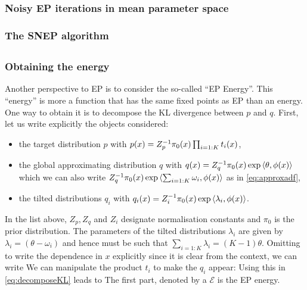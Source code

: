 \subsubsection*{Noisy EP iterations in mean parameter space}

\subsubsection*{The SNEP algorithm}

\subsection{}
\subsubsection*{Obtaining the energy}
Another perspective to EP is to consider the so-called ``EP Energy''. This ``energy'' is more a function that has the same fixed points as EP than an energy. One way to obtain it is to decompose the KL divergence between $p$ and $q$. First, let us write explicitly the objects considered:
\begin{itemize}
	\item the target distribution $p$ with $p(x)=Z_p^{-1} \pi_0(x)\prod_{i=1:K}t_i(x)$,
	\item the global approximating distribution $q$ with $q(x)=Z_q^{-1} \pi_0(x)\exp\left\langle \theta,\phi(x) \right\rangle$ which we can also write $Z_q^{-1} \pi_0(x)\exp\left\langle \sum_{i=1:K}\omega_i,\phi(x) \right\rangle$ as in \eqref{eq:approxadf},
	\item the tilted distributions $q_i$ with $q_i(x)=Z_i^{-1} \pi_0(x)\exp\left\langle \lambda_i,\phi(x) \right\rangle$.
\end{itemize}
In the list above, $Z_p,Z_q$ and $Z_i$ designate normalisation constants and $\pi_0$ is the prior distribution. The parameters of the tilted distributions $\lambda_i$ are given by $\lambda_i=(\theta-\omega_i)$ and hence must be such that $\sum_{i=1:K}\lambda_i=(K-1)\theta$. Omitting to write the dependence in $x$ explicitly since it is clear from the context, we can write
%
%	
We can manipulate the product $t_i$ to make the $q_i$ appear:
%
%
Using this in \eqref{eq:decomposeKL} leads to
%
%
The first part, denoted by a $\mathcal E$ is the EP energy. 

